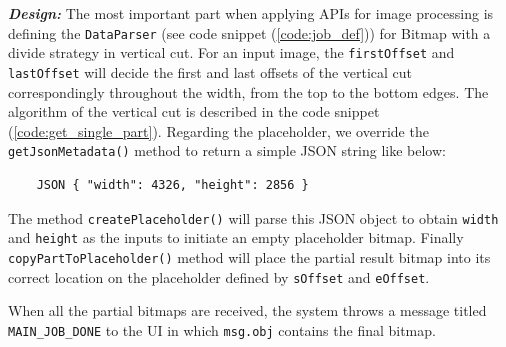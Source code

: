 \documentclass{sig-alternate}[10pt]
\begin{document}
\begin{CCSXML}
\textbf{\emph{Design:}}
The most important part when applying APIs for image processing is defining the \texttt{DataParser} (see code snippet (\ref{code:job_def})) for Bitmap with a divide strategy in vertical cut. For an input image, the \texttt{firstOffset} and \texttt{lastOffset} will decide the first and last offsets of the vertical cut correspondingly throughout the width, from the top to the bottom edges. The algorithm of the vertical cut is described in the code snippet (\ref{code:get_single_part}). Regarding the placeholder, we override the \texttt{getJsonMetadata()} method to return a simple JSON string like below:

	\begin{lstlisting} 
	JSON { "width": 4326, "height": 2856 } 
	\end{lstlisting}

The method \texttt{createPlaceholder()} will parse this JSON object to obtain \texttt{width} and \texttt{height} as the inputs to initiate an empty placeholder bitmap. Finally \texttt{copyPartToPlaceholder()} method will place the partial result bitmap into its correct location on the placeholder defined by \texttt{sOffset} and \texttt{eOffset}.\\

\begin{figure}
\noindent {}
\end{figure}

When all the partial bitmaps are received, the system throws a message titled \texttt{MAIN\_JOB\_DONE} to the UI in which \texttt{msg.obj} contains the final bitmap.


\end{CCSXML}
\end{document}
